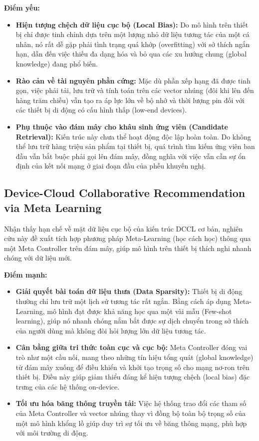 \textbf{Điểm yếu:}
\begin{itemize}
    \item \textbf{Hiện tượng chệch dữ liệu cục bộ (Local Bias):} Do mô hình trên thiết bị chỉ được tinh chỉnh dựa trên một lượng nhỏ dữ liệu tương tác của một cá nhân, nó rất dễ gặp phải tình trạng quá khớp (overfitting) với sở thích ngắn hạn, dẫn đến việc thiếu đa dạng hóa và bỏ qua các xu hướng chung (global knowledge) đang phổ biến.
    \item \textbf{Rào cản về tài nguyên phần cứng:} Mặc dù phần xếp hạng đã được tinh gọn, việc phải tải, lưu trữ và tính toán trên các vector nhúng (đôi khi lên đến hàng trăm chiều) vẫn tạo ra áp lực lớn về bộ nhớ và thời lượng pin đối với các thiết bị di động có cấu hình thấp (low-end devices).
    \item \textbf{Phụ thuộc vào đám mây cho khâu sinh ứng viên (Candidate Retrieval):} Kiến trúc này chưa thể hoạt động độc lập hoàn toàn. Do không thể lưu trữ hàng triệu sản phẩm tại thiết bị, quá trình tìm kiếm ứng viên ban đầu vẫn bắt buộc phải gọi lên đám mây, đồng nghĩa với việc vẫn cần sự ổn định của kết nối mạng ở giai đoạn đầu của phễu khuyến nghị.
\end{itemize}

\subsection{Device-Cloud Collaborative Recommendation via Meta Learning \cite{yao2022meta}}

Nhận thấy hạn chế về mặt dữ liệu cục bộ của kiến trúc DCCL cơ bản, nghiên cứu này đề xuất tích hợp phương pháp Meta-Learning (học cách học) thông qua một Meta Controller trên đám mây, giúp mô hình trên thiết bị thích nghi nhanh chóng với dữ liệu mới.

\textbf{Điểm mạnh:}
\begin{itemize}
    \item \textbf{Giải quyết bài toán dữ liệu thưa (Data Sparsity):} Thiết bị di động thường chỉ lưu trữ một lịch sử tương tác rất ngắn. Bằng cách áp dụng Meta-Learning, mô hình đạt được khả năng học qua một vài mẫu (Few-shot learning), giúp nó nhanh chóng nắm bắt được sự dịch chuyển trong sở thích của người dùng mà không đòi hỏi lượng lớn dữ liệu tương tác.
    \item \textbf{Cân bằng giữa tri thức toàn cục và cục bộ:} Meta Controller đóng vai trò như một cầu nối, mang theo những tín hiệu tổng quát (global knowledge) từ đám mây xuống để điều khiển và khởi tạo trọng số cho mạng nơ-ron trên thiết bị. Điều này giúp giảm thiểu đáng kể hiện tượng chệch (local bias) đặc trưng của các hệ thống on-device.
    \item \textbf{Tối ưu hóa băng thông truyền tải:} Việc hệ thống trao đổi các tham số của Meta Controller và vector nhúng thay vì đồng bộ toàn bộ trọng số của một mô hình khổng lồ giúp duy trì sự tối ưu về băng thông mạng, phù hợp với môi trường di động.
\end{itemize}

